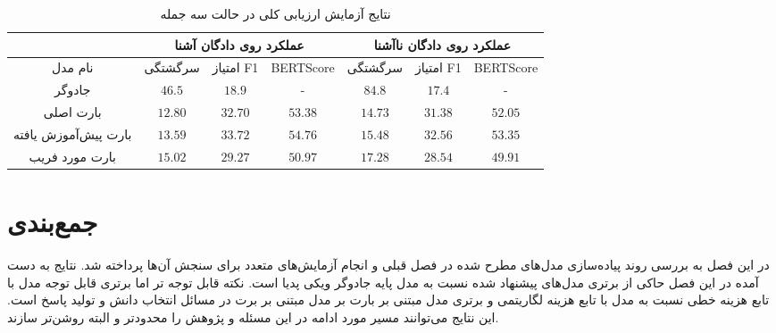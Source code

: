 \begin{table}[ht]
	\caption{نتایج آزمایش ارزیابی کلی در حالت سه جمله}
	\label{table:overall_trisentence}
	\begin{tabular}{|c|c|c|c|c|c|c|}
		\hline
		& \multicolumn{3}{c|}{عملکرد روی دادگان آشنا}            & \multicolumn{3}{c|}{عملکرد روی دادگان نا‌آشنا}         \\ \hline
		نام مدل              & سرگشتگی          & امتیاز F1        & BERTScore        & سرگشتگی          & امتیاز F1        & BERTScore        \\ \hline
		جادوگر               & $46.5$           & $18.9$           & -                & $84.8$           & $17.4$           & -                \\ \hline
		بارت اصلی            & $\mathbf{12.80}$ & $32.70$          & $53.38$          & $\mathbf{14.73}$ & $31.38$          & $52.05$          \\ \hline
		بارت پیش‌آموزش یافته & $13.59$          & $\mathbf{33.72}$ & $\mathbf{54.76}$ & $15.48$          & $\mathbf{32.56}$ & $\mathbf{53.35}$ \\ \hline
		بارت مورد فریب       & $15.02$          & $29.27$          & $50.97$          & $17.28$          & $28.54$          & $49.91$          \\ \hline
	\end{tabular}
\end{table}





\section{جمع‌بندی}
در این فصل به بررسی روند پیاده‌سازی مدل‌های مطرح شده در فصل قبلی و انجام آزمایش‌های متعدد برای سنجش آن‌ها پرداخته شد. نتایج به دست آمده در این فصل حاکی از برتری‌ مدل‌های پیشنهاد شده نسبت به مدل پایه جادوگر ویکی پدیا است. نکته قابل توجه تر اما برتری قابل توجه مدل‌ با تابع هزینه خطی نسبت به مدل با تابع هزینه لگاریتمی و برتری مدل مبتنی بر بارت بر مدل مبتنی بر برت در مسائل انتخاب دانش و تولید پاسخ است. این نتایج می‌توانند مسیر مورد ادامه در این مسئله و پژوهش را محدودتر و البته روشن‌تر سازند. 
